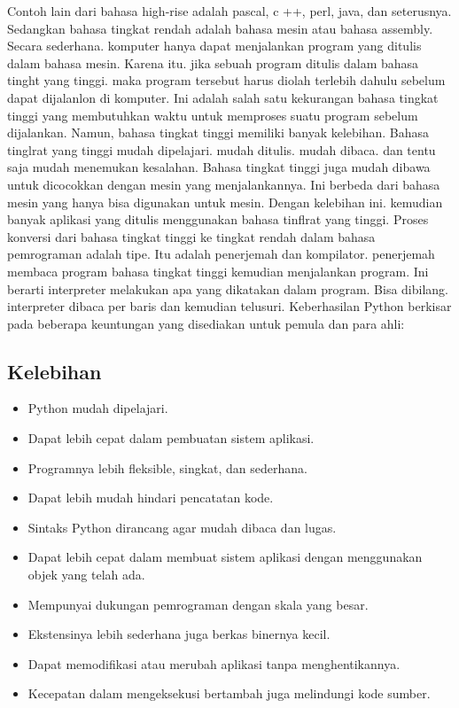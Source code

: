 	Contoh lain dari bahasa high-rise adalah pascal, c ++, perl, java, dan seterusnya. Sedangkan bahasa tingkat rendah adalah bahasa mesin atau bahasa assembly. 
	Secara sederhana. komputer hanya dapat menjalankan program yang ditulis dalam bahasa mesin. Karena itu. jika sebuah program ditulis dalam bahasa tinght yang tinggi. maka program tersebut harus diolah terlebih dahulu sebelum dapat dijalanlon di komputer. 
	Ini adalah salah satu kekurangan bahasa tingkat tinggi yang membutuhkan waktu untuk memproses suatu program sebelum dijalankan. Namun, bahasa tingkat tinggi memiliki banyak kelebihan. Bahasa tinglrat yang tinggi mudah dipelajari. mudah ditulis. mudah dibaca. dan tentu saja mudah menemukan kesalahan. Bahasa tingkat tinggi juga mudah dibawa untuk dicocokkan dengan mesin yang menjalankannya. 
	Ini berbeda dari bahasa mesin yang hanya bisa digunakan untuk mesin. Dengan kelebihan ini. kemudian banyak aplikasi yang ditulis menggunakan bahasa tinflrat yang tinggi. 
	Proses konversi dari bahasa tingkat tinggi ke tingkat rendah dalam bahasa pemrograman adalah tipe. Itu adalah penerjemah dan kompilator. penerjemah membaca program bahasa tingkat tinggi kemudian menjalankan program. 
	Ini berarti interpreter melakukan apa yang dikatakan dalam program. Bisa dibilang. interpreter dibaca per baris dan kemudian telusuri.
	Keberhasilan Python berkisar pada beberapa keuntungan yang disediakan untuk pemula dan para ahli:
	
	\subsection{Kelebihan}
		\begin{itemize}
			\item Python mudah dipelajari.
			\item Dapat lebih cepat dalam pembuatan sistem aplikasi.
			\item Programnya lebih fleksible, singkat, dan sederhana.
			\item Dapat lebih mudah hindari pencatatan kode.
			\item Sintaks Python dirancang agar mudah dibaca dan lugas.
			\item Dapat lebih cepat dalam membuat sistem aplikasi dengan menggunakan objek yang telah ada.
			\item Mempunyai dukungan pemrograman dengan skala yang besar.
			\item Ekstensinya lebih sederhana juga berkas binernya kecil.
			\item Dapat memodifikasi atau merubah aplikasi tanpa menghentikannya.
			\item Kecepatan dalam mengeksekusi bertambah juga melindungi kode sumber.
		\end{itemize}
		
